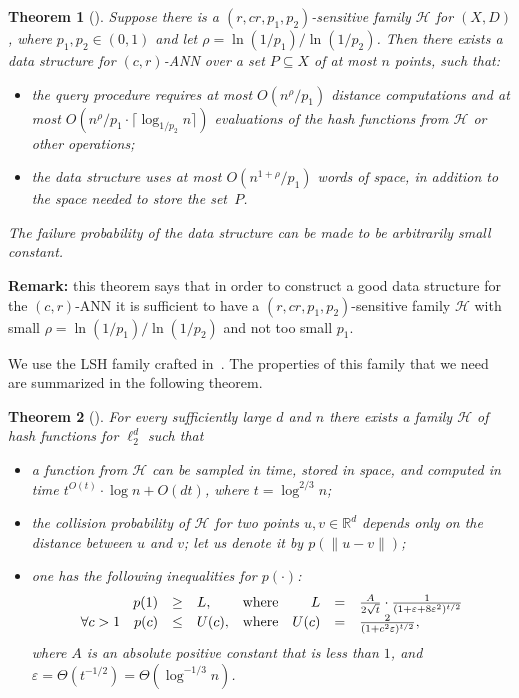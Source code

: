 \documentclass[11pt,letterpaper]{article}
\newtheorem{theorem}{Theorem}
\newcommand{\Rbb}{\mathbb{R}}
\newcommand{\eps}{\varepsilon}
\begin{document}
\begin{theorem}[\cite{him-anntr-12}]
    \label{lsh_to_nn}
    Suppose there is a $(r, cr, p_1, p_2)$-sensitive family $\mathcal{H}$ for $(X, D)$, where $p_1, p_2 \in (0, 1)$ and let
    $\rho = \ln(1/p_1)/\ln(1/p_2)$.
    Then there exists a data structure for $(c, r)$-ANN over a set $P \subseteq X$ of at most $n$ points, such that:
    \begin{itemize}
        \item the query procedure requires at most $O(n^{\rho} / p_1)$ distance computations and at most $O(n^{\rho} / p_1 \cdot \lceil \log_{1 / p_2} n \rceil)$
        evaluations of the hash functions from $\mathcal{H}$ or other operations;
        \item the data structure uses at most $O(n^{1 + \rho} / p_1)$ words of space, in addition to the space needed to store the set~$P$.
    \end{itemize}
    The failure probability of the data structure can be made to be arbitrarily small constant.
\end{theorem}

\textbf{Remark:} this theorem says that in order to construct a good data structure for the $(c, r)$-ANN
it is sufficient to have a $(r, cr, p_1, p_2)$-sensitive family $\mathcal{H}$ with small
$\rho = \ln(1/p_1)/\ln(1/p_2)$ and not too small $p_1$.

We use the LSH family crafted in~\cite{ai-nohaa-06}. The properties of this family
that we need are summarized in the following theorem.

\begin{theorem}[\cite{ai-nohaa-06}]
    \label{ball_carving}
    For every sufficiently large $d$ and $n$ there exists a family $\mathcal{H}$
    of hash functions for $\ell_2^d$ such that
    \begin{itemize}
        \item a function from $\mathcal{H}$ can be sampled in time, stored in
        space, and computed in time $t^{O(t)} \cdot \log n + O(dt)$,
        where $t = \log^{2/3} n$;
        \item the collision probability of $\mathcal{H}$ for two points
        $u, v \in \Rbb^d$ depends only on the distance between $u$ and $v$;
        let us denote it by $p(\|u - v\|)$;
        \item one has the following inequalities for $p(\cdot)$:
\[
		  \begin{array}{rclrrcl}
            p(1) & \geq & L,&\hbox{where}& L & = & \frac{A}{2 \sqrt{t}} \cdot \frac{1}{(1 + \eps + 8\eps^2)^{t/2}}\\
            \forall c > 1 \quad p(c) & \leq & U(c),&\hbox{where}&
            U(c) & = & \frac{2}{(1 + c^2 \eps)^{t/2}}, 
        \end{array}
\]
        where $A$ is an absolute positive constant that is less than $1$, and
        $\eps = \Theta(t^{-1/2}) = \Theta(\log^{-1/3} n)$.
    \end{itemize}
\end{theorem}
\end{document}
